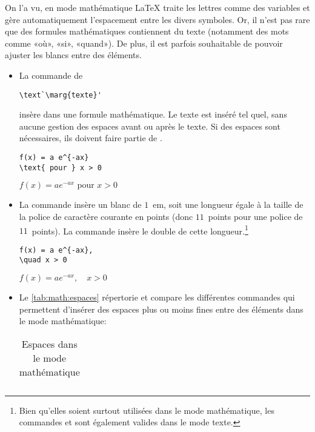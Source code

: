 On l'a vu, en mode mathématique {\LaTeX} traite les lettres comme des
variables et gère automatiquement l'espacement entre les divers
symboles. Or, il n'est pas rare que des formules mathématiques
contiennent du texte (notamment des mots comme «où», «si», «quand»).
De plus, il est parfois souhaitable de pouvoir ajuster les blancs
entre des éléments.
\begin{itemize}
\item La commande de 
\begin{lstlisting}
\text`\marg{texte}'
\end{lstlisting}
  insère  dans une formule mathématique. Le texte est
  inséré tel quel, sans aucune gestion des espaces avant ou après le
  texte. Si des espaces sont nécessaires, ils doivent faire partie de
  .
  \begin{demo}
    \begin{texample}
\begin{lstlisting}
f(x) = a e^{-ax}
\text{ pour } x > 0
\end{lstlisting}
      \producing
      $f(x) = a e^{-ax} \text{ pour } x > 0$
    \end{texample}
  \end{demo}
\item La commande \cmd{\quad} insère un blanc de $1$~em, soit une
  longueur égale à la taille de la police de caractère courante en
  points (donc $11$~points pour une police de $11$~points). La
  commande \cmd{\qquad} insère le double de cette longueur.\footnote{%
    Bien qu'elles soient surtout utilisées dans le mode mathématique,
    les commandes \cmd{\quad} et \cmd{\qquad} sont également valides
    dans le mode texte.}
  \begin{demo}
    \begin{texample}
\begin{lstlisting}
f(x) = a e^{-ax},
\quad x > 0
\end{lstlisting}
      \producing
      $f(x) = a e^{-ax}, \quad x > 0$
    \end{texample}
  \end{demo}
\item Le \autoref{tab:math:espaces} répertorie et compare les
  différentes commandes qui permettent d'insérer des espaces plus ou
  moins fines entre des éléments dans le mode mathématique:
  \begin{table}
    \caption{Espaces dans le mode mathématique}
    \label{tab:math:espaces}
    \centering
    \begin{tabular}{lll}

\end{tabular}
\end{table}
\end{itemize}
